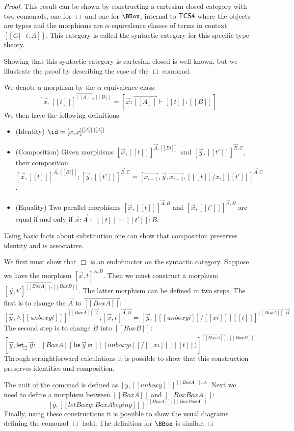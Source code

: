 \begin{proof}
  This result can be shown by constructing a cartesian closed category
  with two comonads, one for $\Box$ and one for $\BBox$, internal to
  $\sf{TCS4}$ where the objects are types and the morphisms are
  $\alpha$-equivalence classes of terms in context $[[G |- t : A]]$.
  This category is called the syntactic category for this specific
  type theory.

  Showing that this syntactic category is cartesian closed is well
  known, but we illustrate the proof by describing the case of the
  $\Box$ comonad.

  We denote a morphism by the $\alpha$-equivalence class:
  \[
  [\vec{x},[[t]] ]^{\vec{[[A]]},[[B]]} = [ \vec{x}:\vec{[[A]]} \vdash [[t]] : [[B]] ]
  \]
  We then have the following definitions:
  \begin{itemize}
  \item (Identity) $\id = [x,x]^{[[A]],[[A]]}$
  \item (Composition) Given morphisms $[\vec{x},[[t]] ]^{\vec{A},[[Bi]]}$ and
    $[\vec{y},[[t']] ]^{\vec{B},C}$, their composition
    $[\vec{x},[[t]] ]^{\vec{A},[[Bi]]};[\vec{y},[[t']] ]^{\vec{B},C} =
    [\vec{x_{i-1}},\vec{y},\vec{x_{i+1}},[ [[t]] / x_i ] [[t']] ]^{\vec{A},C}$.
  \item (Equality) Two parallel morphisms $[\vec{x},[[t]] ]^{\vec{A},B}$ and $[\vec{x},[[t']] ]^{\vec{A},B}$ are
    equal if and only if
    $\vec{x} : \vec{A} \vdash [[t]] = [[t']] : B$.
  \end{itemize}
  Using basic facts about substitution one can show that composition
  preserves identity and is associative.

  We first must show that $\Box$ is an endofunctor on the syntactic
  category.  Suppose we have the morphism
  $[\vec{x},t]^{\vec{A},B}$.  Then we must construct a morphism
  $[\vec{y},t']^{\overrightarrow{[[Box A]]},[[Box B]]}$.  The latter morphism can be defined in two steps.
  The first is to change the $\vec{A}$ to $\overrightarrow{[[Box A]]}$:
  \[
    [ \vec{y},\wedge [[unbox yi]] ]^{\overrightarrow{[[Box A]]},\vec{A}};[\vec{x},t]^{\vec{A},\vec{B}}
    = [\vec{y}, [ [[unbox yi]]/[[xi]] ] [[t]] ]^{\overrightarrow{[[Box A]]},\vec{B}}
    \]
    The second step is to change $B$ into $[[Box B]]$:
    \[
      [\vec{y},\mathsf{let}_\Box\,\vec{y}:\overrightarrow{[[Box A]]}\,\mathsf{be}\,\vec{y}\,\mathsf{in}\,[ [[unbox yi]]/[[xi]] ][[t]])]^{\overrightarrow{[[Box A]]},[[Box B]]}
      \]
  Through straightforward calculations it is possible to show that
  this construction preserves identities and composition.

  The unit of the comonad is defined as $[ y,[[unbox y]] ]^{[[Box
        A]],A}$.  Next we need to define a morphism between $[[Box
      A]]$ and $[[Box Box A]]$:
  \[
  [y,[[letBox y : Box A be y in y]] ]^{[[Box A]],[[Box Box A]]}
  \]
  Finally, using these constructions it is possible to show the usual
  diagrams defining the comonad $\Box$ hold.  The definition for
  $\BBox$ is similar.
\end{proof}
